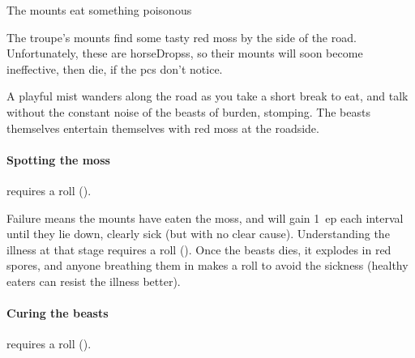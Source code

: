 \label{randommeetings}

\begin{multicols}{2}

{}%
{The mounts eat something poisonous}%

The troupe's mounts find some tasty red moss by the side of the road.
Unfortunately, these are \glspl{horseDrops}, so their mounts will soon become ineffective, then die, if the \glspl{pc} don't notice.

\begin{boxtext}
  A playful mist wanders along the road as you take a short break to eat, and talk without the constant noise of the beasts of burden, stomping.
  The beasts themselves entertain themselves with red moss at the roadside.
\end{boxtext}

\paragraph{Spotting the moss}
requires a  roll (\tn[10]).

Failure means the mounts have eaten the moss, and will gain 1~\gls{ep} each \gls{interval} until they lie down, clearly sick (but with no clear cause).
Understanding the illness at that stage requires a  roll (\tn[14]).
Once the beasts dies, it explodes in red spores, and anyone breathing them in makes a  roll to avoid the sickness (healthy eaters can resist the illness better).

\paragraph{Curing the beasts}
requires a  roll (\tn[12]).

\end{multicols}
